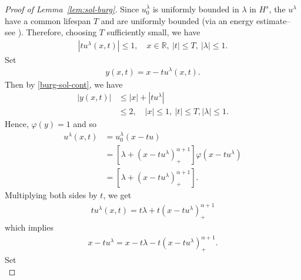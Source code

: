 \documentclass[12pt,reqno]{amsart}
\numberwithin{equation}{section}  %
\numberwithin{figure}{section}
\newcommand{\rr}{\mathbb{R}}
\newcommand{\vp}{\varphi}
\begin{document}
\begin{proof}[Proof of Lemma~\ref{lem:sol-burg}]
Since $u_{0}^{\lambda}$ is uniformly bounded in $\lambda$ in $H^{s}$, the
$u^{\lambda}$ have a common lifespan $T$ and are uniformly bounded (via an
energy estimate--see \cite{Karapetyan:2010fk}). Therefore, choosing $T$
sufficiently small, we have
%
%
\begin{equation}
    \label{burg-sol-cont}
\begin{split}
    | t u^{\lambda}(x,t) | \le 1, \quad x \in \rr, \ | t | \le T, \ | \lambda | \le 1.
\end{split}
\end{equation}
%
%
%
%
Set
%
%
\begin{equation}
    \label{burg-sol-not}
\begin{split}
y(x,t) = x - t u^{\lambda}(x,t).
\end{split}
\end{equation}
%
%
Then by \eqref{burg-sol-cont}, we have
%
%
\begin{equation*}
\begin{split}
    | y(x,t) | & \le | x | + | tu^{\lambda} |
    \\
    & \le 2, \quad | x | \le 1, \ | t | \le T, | \lambda | \le 1.
\end{split}
\end{equation*}
%
%
Hence, $\vp(y) =1$ and so
%
%
\begin{equation}
    \label{burg-sol-redux}
\begin{split}
u^{\lambda}(x,t) 
& = u_{0}^{\lambda}(x - tu)
\\
& = [\lambda + (x - tu^{\lambda})_{+}^{\alpha + 1}] \vp(x - tu^{\lambda})
\\
& = [\lambda + (x - tu^{\lambda})_{+}^{\alpha + 1}].
\end{split}
\end{equation}
%
%
Multiplying both sides by $t$, we get
%
%
\begin{equation*}
\begin{split}
t u^{\lambda}(x,t) = t \lambda + t (x - tu^{\lambda})_{+}^{\alpha + 1}
\end{split}
\end{equation*}
%
%
which implies
%
%
\begin{equation*}
\begin{split}
x - tu^{\lambda} = x - t \lambda - t(x - tu^{\lambda})_{+}^{\alpha + 1}.
\end{split}
\end{equation*}
%
%
Set 
\begin{equation}

\end{equation}
\end{proof}
\end{document}
